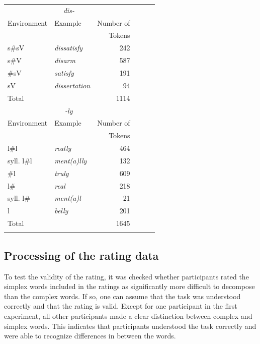 \begin{table}
{\begin{tabular} {llrllr}
			\midrule
			\multicolumn{3}{c}{\textit{dis-}} \\\cmidrule(lr){1-3}
			Environment & Example & Number of & & & \\
			&  & Tokens & & & \\
			\midrule
			s\#sV&\color{lsMidBlue}\textit{dissatisfy} & 242 & & & \\ 
			s\#V&\color{lsMidBlue}\textit{disarm} & 587& & & \\ 
			\#sV&\color{lsMidBlue}\textit{satisfy} & 191& & & \\ 
			sV&\color{lsMidBlue}\textit{dissertation} & 94 & & & \\ 
			Total&  & 1114& & & \\ 
			\midrule
			\multicolumn{3}{c}{\textit{-ly}} \\\cmidrule(lr){1-3}
			Environment & Example & Number of & & & \\
						 &  & Tokens & & & \\
			\midrule
			l\#l &\color{lsMidBlue}\textit{really} & 464 & & & \\ 
			syll. l\#l &\color{lsMidBlue}\textit{ment(a)lly} & 132 & & & \\ 
			\#l &\color{lsMidBlue}\textit{truly} & 609& & & \\ 
			l\# &\color{lsMidBlue}\textit{real} & 218& & & \\ 
			syll. l\#&\color{lsMidBlue}\textit{ment(a)l} &21& & &\\ 
			l &\color{lsMidBlue}\textit{belly} & 201& & & \\ 
			Total&  &1645 & & & \\ 

			\lspbottomrule
		\end{tabular}
	}
	
\end{table}



\subsection{Processing of the rating data} \label{Processing of the Rating Data}


To test the validity of the rating, it was checked whether participants rated the simplex words included in the ratings as significantly more difficult to decompose than the complex words. If so, one can assume that the task was understood correctly and that the rating is valid. 
Except for one participant in the first experiment, all other participants made a clear distinction between complex and simplex words. This indicates that participants understood the task correctly and were able to recognize differences in  between the words.

